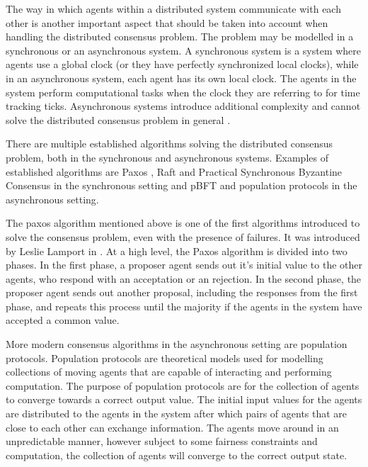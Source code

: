 The way in which agents within a distributed system communicate with each other is another important aspect that should be taken into account when handling the distributed consensus problem. The problem may be modelled in a synchronous or an asynchronous system. A synchronous system is a system where agents use a global clock (or they have perfectly synchronized local clocks), while in an asynchronous system, each agent has its own local clock. The agents in the system perform computational tasks when the clock they are referring to for time tracking ticks. Asynchronous systems introduce additional complexity and cannot solve the distributed consensus problem in general \cite{fischerImpossibilityDistributedConsensus}.

There are multiple established algorithms solving the distributed consensus problem, both in the synchronous and asynchronous systems. Examples of established algorithms are Paxos \cite{lamportFastPaxos2006}, Raft \cite{ongaroSearchUnderstandableConsensus} and Practical Synchronous Byzantine Consensus \cite{renPracticalSynchronousByzantine} in the synchronous setting and pBFT \cite{castroPracticalByzantineFault} and population protocols \cite{aspnesIntroductionPopulationProtocols2009} in the asynchronous setting.

The paxos algorithm mentioned above is one of the first algorithms introduced to solve the consensus problem, even with the presence of failures. It was introduced by Leslie Lamport  in \cite{lamportPartTimeParliment1998}. At a high level, the Paxos algorithm is divided into two phases. In the first phase, a proposer agent sends out it's initial value to the other agents, who respond with an acceptation or an rejection. In the second phase, the proposer agent sends out another proposal, including the responses from the first phase, and repeats this process until the majority if the agents in the system have accepted a common value. 

More modern consensus algorithms in the asynchronous setting are population protocols. Population protocols are theoretical models used for modelling collections of moving agents that are capable of interacting and performing computation. The purpose of population protocols are for the collection of agents to converge towards a correct output value. The initial input values for the agents are distributed to the agents in the system after which pairs of agents that are close to each other can exchange information. The agents move around in an unpredictable manner, however subject to some fairness constraints and computation, the collection of agents will converge to the correct output state. \cite{aspnesIntroductionPopulationProtocols2009} 

